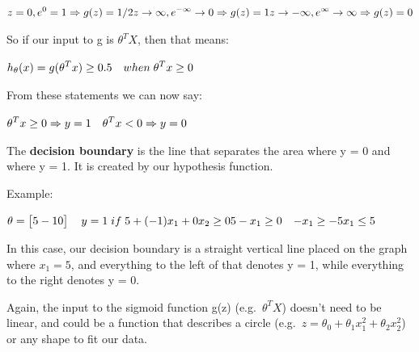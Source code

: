 \documentclass[
]{article}
\begin{document}
\(\begin{align*}z=0, e^{0}=1 \Rightarrow g(z)=1/2\newline z \to \infty, e^{-\infty} \to 0 \Rightarrow g(z)=1 \newline z \to -\infty, e^{\infty}\to \infty \Rightarrow g(z)=0 \end{align*}\)

So if our input to g is \(\theta^T X\), then that means:

\(\begin{align*}& h_\theta(x) = g(\theta^T x) \geq 0.5 \newline& when \; \theta^T x \geq 0\end{align*}\)

From these statements we can now say:

\(\begin{align*}& \theta^T x \geq 0 \Rightarrow y = 1 \newline& \theta^T x < 0 \Rightarrow y = 0 \newline\end{align*}\)

The \textbf{decision boundary} is the line that separates the area where
y = 0 and where y = 1. It is created by our hypothesis function.

Example:

\(\begin{align*}& \theta = \begin{bmatrix}5 \newline -1 \newline 0\end{bmatrix} \newline & y = 1 \; if \; 5 + (-1) x_1 + 0 x_2 \geq 0 \newline & 5 - x_1 \geq 0 \newline & - x_1 \geq -5 \newline& x_1 \leq 5 \newline \end{align*}\)

In this case, our decision boundary is a straight vertical line placed
on the graph where \(x_1 = 5\), and everything to the left of that
denotes y = 1, while everything to the right denotes y = 0.

Again, the input to the sigmoid function g(z) (e.g.~\(\theta^T X\))
doesn't need to be linear, and could be a function that describes a
circle (e.g.~\(z = \theta_0 + \theta_1 x_1^2 +\theta_2 x_2^2\)) or any
shape to fit our data.
\end{document}
